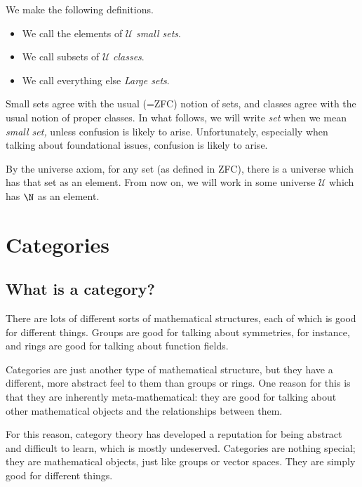 \documentclass[notes.tex]{subfiles}
\begin{document}
\begin{definition}
  \label{def:small_set_class_large_set}
  We make the following definitions.
  \begin{itemize}
    \item We call the elements of $\mathcal{U}$ \emph{small sets}. 
    \item We call subsets of $\mathcal{U}$ \emph{classes}.
    \item We call everything else \emph{Large sets}.
  \end{itemize}

  Small sets agree with the usual (=ZFC) notion of sets, and classes agree with the usual notion of proper classes. In what follows, we will write \emph{set} when we mean \emph{small set,} unless confusion is likely to arise. Unfortunately, especially when talking about foundational issues, confusion is likely to arise.
\end{definition}

By the universe axiom, for any set (as defined in ZFC), there is a universe which has that set as an element. From now on, we will work in some universe $\mathcal{U}$ which has $\N$ as an element.

\section{Categories}\label{sec:categoriesbasicdefinitions}

\subsection{What is a category?}

There are lots of different sorts of mathematical structures, each of which is good for different things. Groups are good for talking about symmetries, for instance, and rings are good for talking about function fields.

Categories are just another type of mathematical structure, but they have a different, more abstract feel to them than groups or rings. One reason for this is that they are inherently meta-mathematical: they are good for talking about other mathematical objects and the relationships between them.

For this reason, category theory has developed a reputation for being abstract and difficult to learn, which is mostly undeserved. Categories are nothing special; they are mathematical objects, just like groups or vector spaces. They are simply good for different things.
\end{document}

